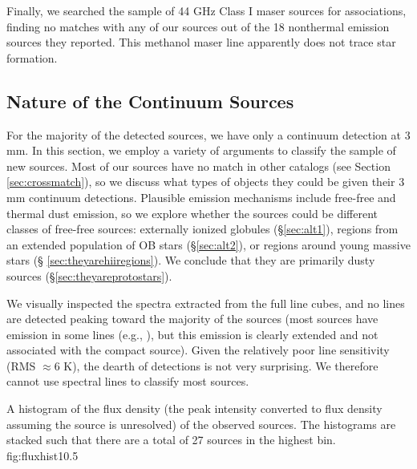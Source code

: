 \documentclass[twocolumn]{aastex61}
\begin{document}
Finally, we searched the \citet{Mehringer1997a} sample of 44 GHz Class I
\methanol maser sources for associations, finding no matches with any of our
sources out of the 18 nonthermal \methanol emission sources they reported.
This methanol maser line apparently does not trace star formation.


\subsection{Nature of the Continuum Sources}
\label{sec:classification}
For the majority of the detected sources, we have only a continuum detection at
3 mm.    In this section, we employ a variety of arguments to classify the
sample of new sources.  Most of our sources have no match in other catalogs
(see Section \ref{sec:crossmatch}), so we discuss what types of objects they
could be given their 3 mm continuum detections.  Plausible emission mechanisms
include free-free and thermal dust emission, so we explore whether the sources
could be different classes of free-free sources: externally ionized
globules (\S \ref{sec:alt1}), \hii regions from an extended population of
OB stars (\S \ref{sec:alt2}), or \hii regions around young massive stars (\S
\ref{sec:theyarehiiregions}).  We conclude that they are
primarily dusty sources (\S \ref{sec:theyareprotostars}).

We visually inspected the spectra extracted from the full line cubes, and no
lines are detected peaking toward the majority of the sources (most sources
have emission in some lines (e.g., \cyanoacetylene), but this emission is
clearly extended and not associated with the compact source).  Given the
relatively poor line sensitivity (RMS $\approx 6$ K), the dearth of detections
is not very surprising.  We therefore cannot use spectral lines to classify
most sources.


{A histogram of the flux density (the peak intensity converted to flux density
assuming the source is unresolved) of the observed sources. 
The histograms are stacked such that there are a total of 27 sources in the
highest bin.
}
{fig:fluxhist}{1}{0.5\textwidth}
\end{document}
